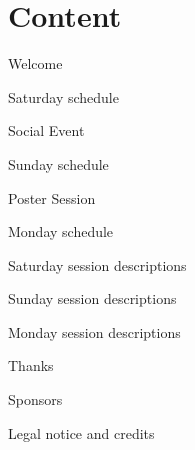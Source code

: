 \section*{Content}
\newlength\contentspace
\setlength\contentspace{0pt}

\vspace*{\contentspace}%
\noindent Welcome\dotfill \pageref{welcome}
%
%
%

\vspace*{\contentspace}%
\noindent Saturday schedule \dotfill \pageref{saturday}

\vspace*{\contentspace}%
\noindent Social Event \dotfill \pageref{social-event}

\vspace*{\contentspace}%
\noindent Sunday schedule \dotfill \pageref{sunday}

\vspace*{\contentspace}%
\noindent Poster Session \dotfill \pageref{poster-event}

\vspace*{\contentspace}%
\noindent Monday schedule \dotfill \pageref{monday}

\vspace*{\contentspace}%
\noindent Saturday session descriptions \dotfill \pageref{saturday-descriptions}

\vspace*{\contentspace}%
\noindent Sunday session descriptions \dotfill \pageref{sunday-descriptions}

\vspace*{\contentspace}%
\noindent Monday session descriptions \dotfill \pageref{monday-descriptions}

\vspace*{\contentspace}%
\noindent Thanks \dotfill \pageref{thanks}

\vspace*{\contentspace}%
\noindent Sponsors \dotfill \pageref{sponsors}

\vspace*{\contentspace}%
\noindent Legal notice and credits \dotfill \pageref{legal}

